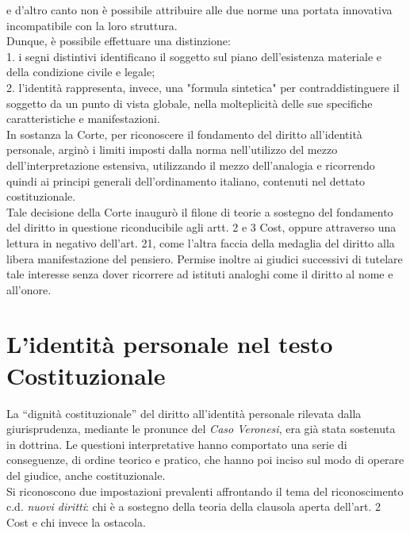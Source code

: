 e d'altro canto non è possibile attribuire alle due norme una portata innovativa incompatibile con la loro struttura. 
\\Dunque, è possibile effettuare una distinzione:
\\1. i segni distintivi identificano il soggetto sul piano dell'esistenza materiale e della condizione civile e legale; 
\\2. l'identità rappresenta, invece, una "formula sintetica" per contraddistinguere il soggetto da un punto di vista globale, nella molteplicità delle sue specifiche caratteristiche e manifestazioni.
\\In sostanza la Corte, per riconoscere il fondamento del diritto all'identità personale, arginò i limiti imposti dalla norma nell'utilizzo del mezzo dell'interpretazione estensiva, utilizzando il mezzo dell'analogia e ricorrendo quindi ai principi generali dell'ordinamento italiano, contenuti nel dettato costituzionale.
\\Tale decisione della Corte inaugurò il filone di teorie a sostegno del fondamento del diritto in questione riconducibile agli artt. 2 e 3 Cost, oppure attraverso una lettura in negativo dell'art. 21, come l'altra faccia della medaglia del diritto alla libera manifestazione del pensiero.
Permise inoltre ai giudici successivi di tutelare tale interesse senza dover ricorrere ad istituti analoghi come il diritto al nome e all'onore.


\section{L'identità personale nel testo Costituzionale}
La “dignità costituzionale” del diritto all’identità personale rilevata dalla giurisprudenza, mediante le pronunce del \textit{Caso Veronesi}, era già stata sostenuta in dottrina. 
Le questioni interpretative hanno comportato una serie di conseguenze, di ordine teorico e pratico, che hanno poi inciso sul modo di operare del giudice, anche costituzionale.
\\Si riconoscono due impostazioni prevalenti affrontando il tema del riconoscimento c.d. \textit{nuovi diritti}: chi è a sostegno della teoria della clausola aperta dell'art. 2 Cost e chi invece la ostacola.


